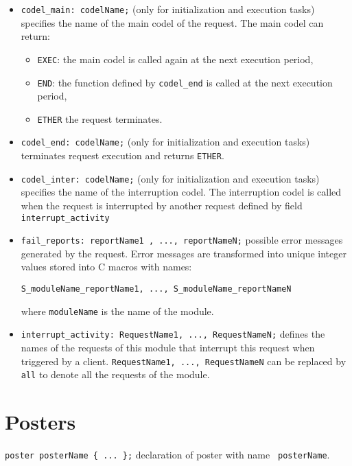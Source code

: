\begin{itemize}
\item[]\texttt{codel\_main: codelName;} (only for initialization and execution
tasks) specifies the name of the main codel of the request. The main
codel can return:
\begin{itemize}
\item \texttt{EXEC}: the main codel is called again
  at the next execution period,
\item \texttt{END}: the function defined by \texttt{codel\_end} is called at the
  next execution period,
\item \texttt{ETHER} the request terminates.
\end{itemize}

\item[]\texttt{codel\_end:  codelName;} (only for initialization and execution
tasks) terminates request execution and returns \texttt{ETHER}.

\item[]\texttt{codel\_inter: codelName;} (only for initialization and execution
tasks) specifies the name of the interruption codel. The interruption
codel is called when the request is interrupted by another request
defined by field \texttt{interrupt\_activity}\\

\item[]\texttt{fail\_reports:  reportName1 , ..., reportNameN;}
possible error messages generated by the request. Error messages are
transformed into unique integer values stored into C macros with
names:
\begin{verbatim}
S_moduleName_reportName1, ..., S_moduleName_reportNameN
\end{verbatim}
where \texttt{moduleName} is the name of the module.

\item[]\texttt{interrupt\_activity:         RequestName1, ..., RequestNameN;}
defines the names of the requests of this module that interrupt this request when
triggered by a client. \texttt{RequestName1, ..., RequestNameN} can be
replaced by \texttt{all} to denote all the requests of the module.

\end{itemize}

\section{Posters}
\label{sec|posters}

\texttt{poster posterName \{ ... \};} declaration of poster with name
\texttt{  posterName}.\\

